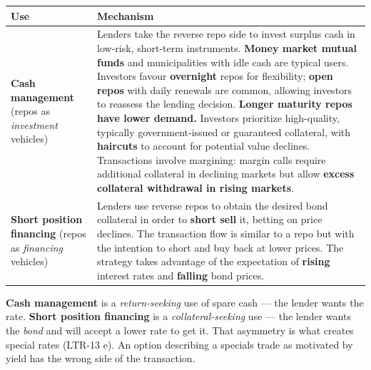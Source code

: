 \begin{center}
\small
\begin{tabularx}{\textwidth}{@{}p{4.1cm} X@{}}
\toprule
\rowcolor{FRMSoft}\textbf{Use} & \textbf{Mechanism} \\
\midrule
\textbf{Cash management} \newline (repos as \emph{investment} vehicles) &
Lenders take the reverse repo side to invest surplus cash in low-risk, short-term instruments. \textbf{Money market mutual funds} and municipalities with idle cash are typical users. Investors favour \textbf{overnight} repos for flexibility; \textbf{open repos} with daily renewals are common, allowing investors to reassess the lending decision. \textbf{Longer maturity repos have lower demand.} Investors prioritize high-quality, typically government-issued or guaranteed collateral, with \textbf{haircuts} to account for potential value declines. Transactions involve margining: margin calls require additional collateral in declining markets but allow \textbf{excess collateral withdrawal in rising markets}. \\
\addlinespace
\textbf{Short position financing} \newline (repos as \emph{financing} vehicles) &
Lenders use reverse repos to obtain the desired bond collateral in order to \textbf{short sell} it, betting on price declines. The transaction flow is similar to a repo but with the intention to short and buy back at lower prices. The strategy takes advantage of the expectation of \textbf{rising} interest rates and \textbf{falling} bond prices. \\
\bottomrule
\end{tabularx}
\end{center}

\begin{lrtrapbox}
\textbf{Cash management} is a \emph{return-seeking} use of spare cash --- the lender wants the rate. \textbf{Short position financing} is a \emph{collateral-seeking} use --- the lender wants the \emph{bond} and will accept a lower rate to get it. That asymmetry is what creates special rates (LTR-13 e). An option describing a specials trade as motivated by yield has the wrong side of the transaction.
\end{lrtrapbox}


